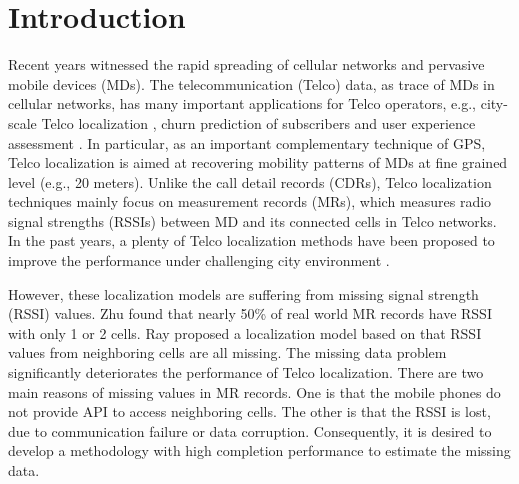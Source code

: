 \section{Introduction}
Recent years witnessed the rapid spreading of cellular networks and pervasive mobile devices (MDs). The telecommunication (Telco) data, as trace of MDs in cellular networks, has many important applications for Telco operators, e.g., city-scale Telco localization \cite{DBLP:conf/cikm/ZhuLYZZGDRZ16}, churn prediction of subscribers \cite{DBLP:conf/sigmod/HuangZYDLND0Z15} and user experience assessment \cite{DBLP:journals/tist/LuoZYDY16}. In particular, as an important complementary technique of GPS, Telco localization is aimed at recovering mobility patterns of MDs at fine grained level (e.g., 20 meters). Unlike the call detail records (CDRs), Telco localization techniques mainly focus on measurement records (MRs), which measures radio signal strengths (RSSIs) between MD and its connected cells in Telco networks. In the past years, a plenty of Telco localization methods have been proposed to improve the performance under challenging city environment \cite{DBLP:conf/icc/IbrahimY11, DBLP:conf/icc/HaraAYDZ11,DBLP:journals/tvt/IbrahimY12,DBLP:conf/infocom/RayDM16,DBLP:conf/infocom/MargoliesBBDJUV17}.

However, these localization models are suffering from missing signal strength (RSSI) values. Zhu \cite{DBLP:conf/cikm/ZhuLYZZGDRZ16} found that nearly 50\% of real world MR records have RSSI with only 1 or 2 cells. Ray \cite{DBLP:conf/infocom/RayDM16} proposed a localization model based on that RSSI values from neighboring cells are all missing. The missing data problem significantly deteriorates the performance of Telco localization. There are two main reasons of missing values in MR records. One is that the mobile phones do not provide API to access neighboring cells. The other is that the RSSI is lost, due to communication failure or data corruption. Consequently, it is desired to develop a methodology with high completion performance to estimate the missing data.


